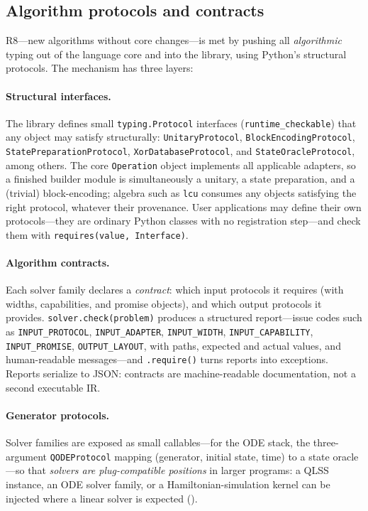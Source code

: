 \subsection{Algorithm protocols and contracts}
\label{sec:protocols}

R8---new algorithms without core changes---is met by pushing all
\emph{algorithmic} typing out of the language core and into the library,
using Python's structural protocols.  The mechanism has three layers:

\paragraph{Structural interfaces.}
The library defines small \texttt{typing.Protocol} interfaces
(\texttt{runtime\_checkable}) that any object may satisfy structurally:
\texttt{UnitaryProtocol}, \texttt{Block\-Encoding\-Protocol},
\texttt{State\-Preparation\-Protocol}, \texttt{XorDatabase\-Protocol},
and \texttt{StateOracleProtocol}, among others.  The core \texttt{Operation} object
implements all applicable adapters, so a finished builder module is
simultaneously a unitary, a state preparation, and a (trivial)
block-encoding; algebra such as \texttt{lcu} consumes any objects satisfying
the right protocol, whatever their provenance.  User applications may define
their own protocols---they are ordinary Python classes with no registration
step---and check them with \texttt{requires(value, Interface)}.

\paragraph{Algorithm contracts.}
Each solver family declares a \emph{contract}: which input protocols it
requires (with widths, capabilities, and promise objects), and which output
protocols it provides.  \texttt{solver.check(problem)} produces a structured
report---issue codes such as \texttt{INPUT\_PROTOCOL},
\texttt{INPUT\_ADAPTER}, \texttt{INPUT\_WIDTH}, \texttt{INPUT\_CAPABILITY},
\texttt{INPUT\_PROMISE}, \texttt{OUTPUT\_LAYOUT}, with paths, expected and
actual values, and human-readable messages---and \texttt{.require()} turns
reports into exceptions.  Reports serialize to JSON: contracts are
machine-readable documentation, not a second executable IR.

\paragraph{Generator protocols.}
Solver families are exposed as small callables---for the ODE stack, the
three-argument \texttt{QODEProtocol} mapping (generator, initial state,
time) to a state oracle---so that \emph{solvers are plug-compatible
positions} in larger programs: a QLSS instance, an ODE solver family, or a
Hamiltonian-simulation kernel can be injected where a linear solver is
expected ().

